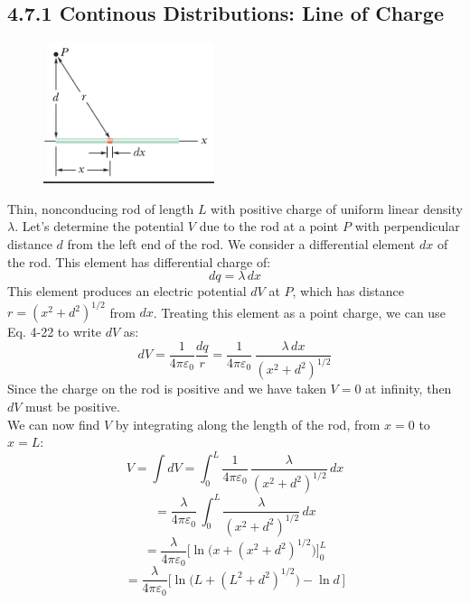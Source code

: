 \documentclass[12pt, a4paper]{article}
\begin{document}
	
	
		\subsection*{4.7.1 Continous Distributions: Line of Charge}
		
		\begin{figure}
			\centering
			\includegraphics[width=5cm]{Physics2_PNGs/rod-continous.png}
			\caption*{}
			\label{fig:rod-continous.png}
		\end{figure}
		Thin, nonconducing rod of length $L$ with positive charge of uniform linear density $\lambda$. Let's determine the potential $V$ due to the rod at a point $P$ with perpendicular distance $d$ from the left end of the rod. We consider a differential element $dx$ of the rod. This element has differential charge of:
		\[
			dq = \lambda \, dx
			\tag{4-24}
		\]
		This element produces an electric potential $dV$ at $P$, which has distance 
		$r = (x^2 + d^2)^{1/2}$ from $dx$. Treating this element as a point charge, we can use Eq. 4-22 to write $dV$ as:
		\begin{equation*}
			dV = \frac{1}{4 \pi \varepsilon_0} \frac{dq}{r}
			   = \frac{1}{4 \pi \varepsilon_0} \, \frac{\lambda \, dx}{(x^2 + d^2)^{1/2}}
			\tag{4-25}
		\end{equation*}
		Since the charge on the rod is positive and we have taken $V = 0$ at infinity, then $dV$ must be positive. \\
		We can now find $V$ by integrating along the length of the rod, from $x = 0$ to 
		$x = L$:
		\begin{equation*}
			V = \int dV = \int_{0}^{L} \frac{1}{4 \pi \varepsilon_0}
			              \, \frac{\lambda}{(x^2 + d^2)^{1/2}} \, dx 
		\end{equation*}
		\[
			= \frac{\lambda}{4 \pi \varepsilon_0} \, 
			  \int_0^L \frac{\lambda}{(x^2 + d^2)^{1/2}} \, dx
		\]
		\[
			= \frac{\lambda}{4 \pi \varepsilon_0} 
			    \biggl[ \ln \biggl( x + (x^2 + d^2)^{1/2} \biggl) \biggl]_0^L
		\]
		\[
			= \frac{\lambda}{4 \pi \varepsilon_0} 
				\biggl[ \ln \biggl( L + (L^2 + d^2)^{1/2} \biggl) - \ln d \, \biggl]
		\]
		
\end{document}
